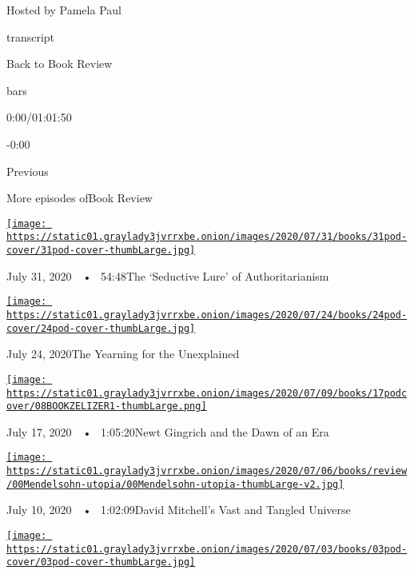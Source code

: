 Hosted by Pamela Paul

transcript

Back to Book Review

bars

0:00/01:01:50

-0:00

Previous

More episodes ofBook Review

\href{https://www.nytimes3xbfgragh.onion/2020/07/31/books/review/podcast-twilight-democracy-anne-applebaum-eat-buddha-barbara-demick.html?action=click\&module=audio-series-bar\&region=header\&pgtype=Article}{\texttt{[image: https://static01.graylady3jvrrxbe.onion/images/2020/07/31/books/31pod-cover/31pod-cover-thumbLarge.jpg]}}

July 31, 2020~~•~ 54:48The `Seductive Lure' of Authoritarianism

\href{https://www.nytimes3xbfgragh.onion/2020/07/24/books/review/podcast-colin-dickey-unexplained-miles-harvey-king-of-confidence.html?action=click\&module=audio-series-bar\&region=header\&pgtype=Article}{\texttt{[image: https://static01.graylady3jvrrxbe.onion/images/2020/07/24/books/24pod-cover/24pod-cover-thumbLarge.jpg]}}

July 24, 2020The Yearning for the Unexplained

\href{https://www.nytimes3xbfgragh.onion/2020/07/17/books/review/podcast-julian-zelizer-burning-down-house-newt-gingrich-notes-silencing-lacy-crawford.html?action=click\&module=audio-series-bar\&region=header\&pgtype=Article}{\texttt{[image: https://static01.graylady3jvrrxbe.onion/images/2020/07/09/books/17podcover/08BOOKZELIZER1-thumbLarge.png]}}

July 17, 2020~~•~ 1:05:20Newt Gingrich and the Dawn of an Era

\href{https://www.nytimes3xbfgragh.onion/2020/07/10/books/review/david-mitchell-utopia-avenue-daniel-mendelsohn-biggest-bluff-poker-maria-konnikova.html?action=click\&module=audio-series-bar\&region=header\&pgtype=Article}{\texttt{[image: https://static01.graylady3jvrrxbe.onion/images/2020/07/06/books/review/00Mendelsohn-utopia/00Mendelsohn-utopia-thumbLarge-v2.jpg]}}

July 10, 2020~~•~ 1:02:09David Mitchell's Vast and Tangled Universe

\href{https://www.nytimes3xbfgragh.onion/2020/07/03/books/review/podcast-jules-feiffer-smart-george-steve-inskeep-imperfect-union.html?action=click\&module=audio-series-bar\&region=header\&pgtype=Article}{\texttt{[image: https://static01.graylady3jvrrxbe.onion/images/2020/07/03/books/03pod-cover/03pod-cover-thumbLarge.jpg]}}

